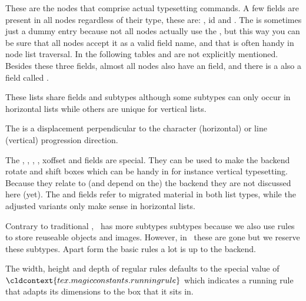 These are the nodes that comprise actual typesetting commands. A few fields are
present in all nodes regardless of their type, these are: , \type
{id} and . The  is sometimes just a dummy entry
because not all nodes actually use the , but this way you can be
sure that all nodes accept it as a valid field name, and that is often handy in
node list traversal. In the following tables  and  are not
explicitly mentioned. Besides these three fields, almost all nodes also have an
 field, and there is a also a field called .

\startsubsection[title={hlist and vlist, aka boxes}]

These lists share fields and subtypes although some subtypes can only occur in
horizontal lists while others are unique for vertical lists.


The  is a displacement perpendicular to the character (horizontal) or
line (vertical) progression direction.

The , , , , \type
{xoffset} and  fields are special. They can be used to make the
backend rotate and shift boxes which can be handy in for instance vertical
typesetting. Because they relate to (and depend on the) the backend they are not
discussed here (yet). The  and  fields refer to migrated
material in both list types, while the adjusted variants only make sense in
horizontal lists.


\stopsubsection

\startsubsection[title={rule}]

Contrary to traditional \TEX, \LUATEX\ has more subtypes subtypes because we also
use rules to store reuseable objects and images. However, in \LUAMETATEX\ these
are gone but we reserve these subtypes. Apart form the basic rules a lot is up to
the backend.


The width, height and depth of regular rules defaults to the special value of
$\cldcontext {tex . magicconstants . runningrule}$ which indicates a running rule
that adapts its dimensions to the box that it sits in.


